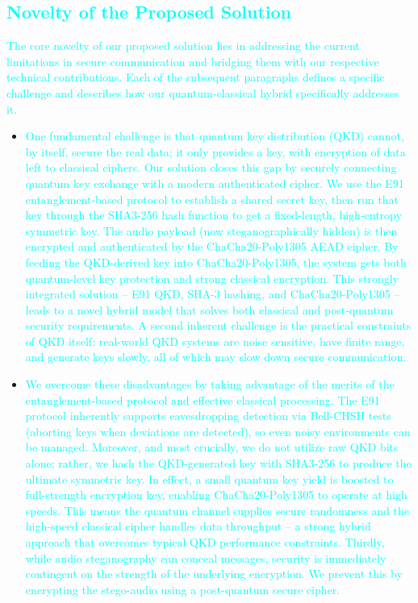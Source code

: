 \documentclass[a4paper]{cas-sc}
\begin{document}
\subsection{\textcolor{cyan}{Novelty of the Proposed Solution}}
\textcolor{cyan}{The core novelty of our proposed solution lies in addressing the current limitations in secure communication and bridging them with our respective technical contributions. Each of the subsequent paragraphs defines a specific challenge and describes how our quantum-classical hybrid specifically addresses it.}
\begin{itemize}

    \item \textcolor{cyan}{One fundamental challenge is that quantum key distribution (QKD) cannot, by itself, secure the real data; it only provides a key, with encryption of data left to classical ciphers. Our solution closes this gap by securely connecting quantum key exchange with a modern authenticated cipher. We use the E91 entanglement-based protocol to establish a shared secret key, then run that key through the SHA3-256 hash function to get a fixed-length, high-entropy symmetric key. The audio payload (now steganographically hidden) is then encrypted and authenticated by the ChaCha20-Poly1305 AEAD cipher. By feeding the QKD-derived key into ChaCha20-Poly1305, the system gets both quantum-level key protection and strong classical encryption. This strongly integrated solution – E91 QKD, SHA-3 hashing, and ChaCha20-Poly1305 – leads to a novel hybrid model that solves both classical and post-quantum security requirements. A second inherent challenge is the practical constraints of QKD itself: real-world QKD systems are noise sensitive, have finite range, and generate keys slowly, all of which may slow down secure communication.}

    \item \textcolor{cyan}{We overcome these disadvantages by taking advantage of the merits of the entanglement-based protocol and effective classical processing. The E91 protocol inherently supports eavesdropping detection via Bell-CHSH tests (aborting keys when deviations are detected), so even noisy environments can be managed. Moreover, and most crucially, we do not utilize raw QKD bits alone; rather, we hash the QKD-generated key with SHA3-256 to produce the ultimate symmetric key. In effect, a small quantum key yield is boosted to full-strength encryption key, enabling ChaCha20-Poly1305 to operate at high speeds. This means the quantum channel supplies secure randomness and the high-speed classical cipher handles data throughput -- a strong hybrid approach that overcomes typical QKD performance constraints. Thirdly, while audio steganography can conceal messages, security is immediately contingent on the strength of the underlying encryption. We prevent this by encrypting the stego-audio using a post-quantum secure cipher.}


\end{itemize}
\end{document}
